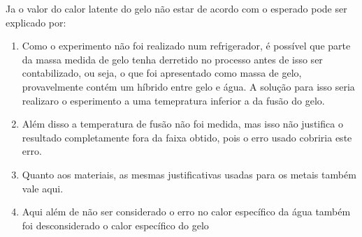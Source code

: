 \documentclass[a4paper]{article}
\begin{document}
		Ja o valor do calor latente do gelo não estar de acordo com o esperado
		pode ser explicado por:
			\begin{enumerate}
				\item Como o experimento não foi realizado num refrigerador, é possível
				que parte da massa medida de gelo tenha derretido no processo antes
				de isso ser contabilizado, ou seja, o que foi apresentado como massa
				de gelo, provavelmente contém um híbrido entre gelo e água. A solução
				para isso seria realizaro o esperimento a uma temepratura inferior
				a da fusão do gelo.
				\item Além disso a temperatura de fusão não foi medida, mas isso não justifica
				o resultado completamente fora da faixa obtido, pois o erro usado cobriria este
				erro.
				\item Quanto aos materiais, as mesmas justificativas usadas para os metais
				também vale aqui.
				\item Aqui além de não ser considerado o erro no calor específico da água
				também foi desconsiderado o calor específico do gelo
			\end{enumerate}
\end{document}
